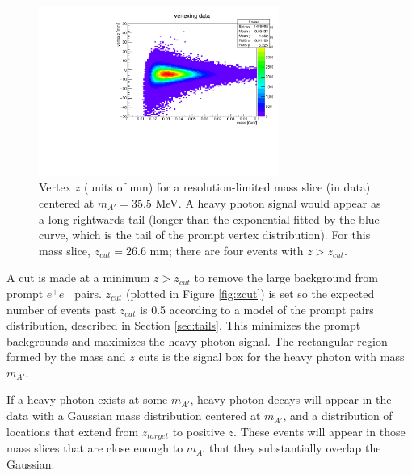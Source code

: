 \begin{figure}[ht]
\begin{center}
    \includegraphics[width=0.7\textwidth,page=61,angle=-90]{vertexing/figs/golden_mres}
\end{center}
\caption{Vertex $z$ (units of mm) for a resolution-limited mass slice (in data) centered at $m_{A'}=35.5$ MeV. A heavy photon signal would appear as a long rightwards tail (longer than the exponential fitted by the blue curve, which is the tail of the prompt vertex distribution).
    For this mass slice, $z_{cut}=26.6$ mm; there are four events with $z>z_{cut}$.}
    \label{fig:vz_1d}
\end{figure}

A cut is made at a minimum $z>z_{cut}$ to remove the large background from prompt $e^+e^-$ pairs.
$z_{cut}$ (plotted in Figure \ref{fig:zcut}) is set so the expected number of events past $z_{cut}$ is 0.5 according to a model of the prompt pairs distribution, described in Section \ref{sec:tails}.
This minimizes the prompt backgrounds and maximizes the heavy photon signal.
The rectangular region formed by the mass and $z$ cuts is the signal box for the heavy photon with mass $m_{A'}$.

If a heavy photon exists at some $m_{A'}$, heavy photon decays will appear in the data with a Gaussian mass distribution centered at $m_{A'}$, and a distribution of locations that extend from $z_{target}$ to positive $z$.
These events will appear in those mass slices that are close enough to $m_{A'}$ that they substantially overlap the Gaussian.

